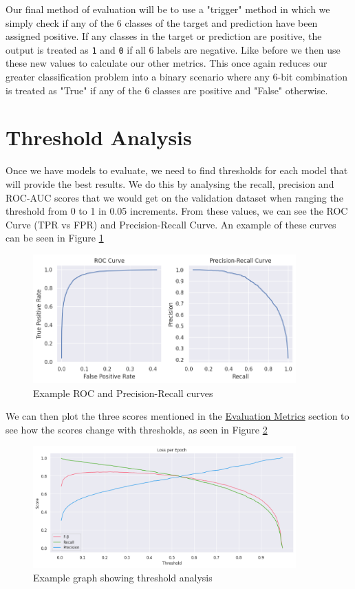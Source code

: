 Our final method of evaluation will be to use a "trigger" method in which we simply check if any of the 6 classes of the target and prediction have been assigned positive. If any classes in the target or prediction are positive, the output is treated as \verb|1| and \verb|0| if all 6 labels are negative. Like before we then use these new values to calculate our other metrics. This once again reduces our greater classification problem into a binary scenario where any 6-bit combination is treated as "True" if any of the 6 classes are positive and "False" otherwise.

\section{Threshold Analysis}
\label{threshold}

Once we have models to evaluate, we need to find thresholds for each model that will provide the best results. We do this by analysing the recall, precision and ROC-AUC scores that we would get on the validation dataset when ranging the threshold from 0 to 1 in 0.05 increments. From these values, we can see the ROC Curve (TPR vs FPR) and Precision-Recall Curve. An example of these curves can be seen in Figure \ref{fig:curves}

\begin{figure}[H]
    \centering
    \includegraphics[width=0.9\textwidth]{graphs/curves.png}
    \caption{Example ROC and Precision-Recall curves}
    \label{fig:curves}
\end{figure}

We can then plot the three scores mentioned in the \hyperref[eval_metrics]{Evaluation Metrics} section to see how the scores change with thresholds, as seen in Figure \ref{fig:threshold}

\begin{figure}[H]
    \centering
    \includegraphics[width=0.9\textwidth]{graphs/training/example_curves.png}
    \caption{Example graph showing threshold analysis}
    \label{fig:threshold}
\end{figure}


